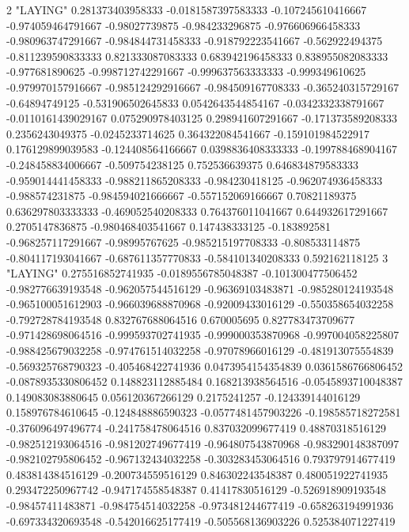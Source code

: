 2 "LAYING" 0.281373403958333 -0.0181587397583333 -0.107245610416667 -0.974059464791667 -0.98027739875 -0.984233296875 -0.976606966458333 -0.980963747291667 -0.984844731458333 -0.918792223541667 -0.562922494375 -0.811239590833333 0.821333087083333 0.683942196458333 0.838955082083333 -0.977681890625 -0.998712742291667 -0.999637563333333 -0.999349610625 -0.979970157916667 -0.985124292916667 -0.984509167708333 -0.365240315729167 -0.64894749125 -0.531906502645833 0.0542643544854167 -0.0342332338791667 -0.0110161439029167 0.075290978403125 0.298941607291667 -0.171373589208333 0.2356243049375 -0.0245233714625 0.364322084541667 -0.159101984522917 0.176129899039583 -0.124408564166667 0.0398836408333333 -0.199788468904167 -0.248458834006667 -0.509754238125 0.752536639375 0.646834879583333 -0.959014441458333 -0.988211865208333 -0.984230418125 -0.962074936458333 -0.988574231875 -0.984594021666667 -0.557152069166667 0.70821189375 0.636297803333333 -0.469052540208333 0.764376011041667 0.644932617291667 0.2705147836875 -0.980468403541667 0.147438333125 -0.183892581 -0.968257117291667 -0.98995767625 -0.985215197708333 -0.808533114875 -0.804117193041667 -0.687611357770833 -0.584101340208333 0.592162118125
3 "LAYING" 0.275516852741935 -0.0189556785048387 -0.101300477506452 -0.982776639193548 -0.962057544516129 -0.96369103483871 -0.985280124193548 -0.965100051612903 -0.966039688870968 -0.92009433016129 -0.550358654032258 -0.792728784193548 0.832767688064516 0.670005695 0.827783473709677 -0.971428698064516 -0.999593702741935 -0.999000353870968 -0.997004058225807 -0.988425679032258 -0.974761514032258 -0.97078966016129 -0.481913075554839 -0.569325768790323 -0.405468422741936 0.0473954154354839 0.0361586766806452 -0.0878935330806452 0.148823112885484 0.168213938564516 -0.0545893710048387 0.149083083880645 0.056120367266129 0.2175241257 -0.124339144016129 0.158976784610645 -0.124848886590323 -0.0577481457903226 -0.198585718272581 -0.376096497496774 -0.241758478064516 0.837032099677419 0.48870318516129 -0.982512193064516 -0.981202749677419 -0.964807543870968 -0.983290148387097 -0.982102795806452 -0.967132434032258 -0.303283453064516 0.793797914677419 0.483814384516129 -0.200734559516129 0.846302243548387 0.480051922741935 0.293472250967742 -0.947174558548387 0.41417830516129 -0.526918909193548 -0.98457411483871 -0.984754514032258 -0.973481244677419 -0.658263194991936 -0.697334320693548 -0.542016625177419 -0.505568136903226 0.525384071227419
